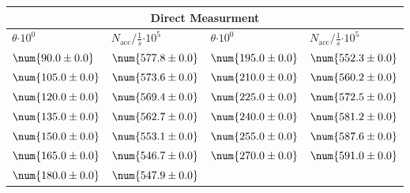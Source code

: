 \begin{tabular}{|p{}|p{}||p{}|p{}|}
\hline
\multicolumn{4}{|c|}{Direct Measurment}\\
\hline
$\theta$$\cdot 10^{0}$&$N_\text{acc}/\frac{1}{s}$$\cdot 10^{5}$&$\theta$$\cdot 10^{0}$&$N_\text{acc}/\frac{1}{s}$$\cdot 10^{5}$\\
\hline
$\num{90.0\pm 0.0}$&$\num{577.8\pm 0.0}$&$\num{195.0\pm 0.0}$&$\num{552.3\pm 0.0}$\\
$\num{105.0\pm 0.0}$&$\num{573.6\pm 0.0}$&$\num{210.0\pm 0.0}$&$\num{560.2\pm 0.0}$\\
$\num{120.0\pm 0.0}$&$\num{569.4\pm 0.0}$&$\num{225.0\pm 0.0}$&$\num{572.5\pm 0.0}$\\
$\num{135.0\pm 0.0}$&$\num{562.7\pm 0.0}$&$\num{240.0\pm 0.0}$&$\num{581.2\pm 0.0}$\\
$\num{150.0\pm 0.0}$&$\num{553.1\pm 0.0}$&$\num{255.0\pm 0.0}$&$\num{587.6\pm 0.0}$\\
$\num{165.0\pm 0.0}$&$\num{546.7\pm 0.0}$&$\num{270.0\pm 0.0}$&$\num{591.0\pm 0.0}$\\
$\num{180.0\pm 0.0}$&$\num{547.9\pm 0.0}$&&\\
\hline
\end{tabular}